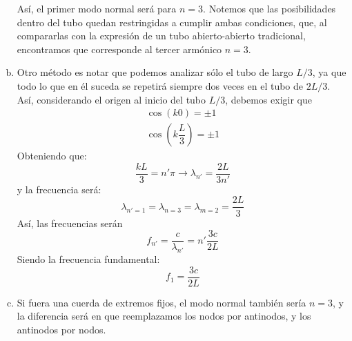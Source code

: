 \begin{enumerate}[a)]
	Así, el primer modo normal será para $n=3$. Notemos que las posibilidades dentro del tubo quedan restringidas a cumplir ambas condiciones, que, al compararlas con la expresión de un tubo abierto-abierto tradicional, encontramos que corresponde al tercer armónico $n=3$.
	
	\item Otro método es notar que podemos analizar sólo el tubo de largo $L/3$, ya que todo lo que en él suceda se repetirá siempre dos veces en el tubo de $2L/3$. Así, considerando el origen al inicio del tubo $L/3$, debemos exigir que
	\begin{align*}
		\cos \left( k 0 \right) = \pm 1 \\
		\cos \left( k \dfrac{L}{3} \right) = \pm 1
	\end{align*}
	Obteniendo que:
	\begin{equation*}
		\dfrac{kL}{3} = n' \pi \rightarrow \lambda_{n'} = \dfrac{2L}{3n'}
	\end{equation*}
	y la frecuencia será:
	\begin{equation*}
		\lambda_{n'=1} = \lambda_{n=3} = \lambda_{m=2} = \dfrac{2L}{3}
	\end{equation*}
	Así, las frecuencias serán
	\begin{equation*}
		f_{n'} = \dfrac{c}{\lambda_{n'}} = n' \dfrac{3c}{2L}
	\end{equation*}
	Siendo la frecuencia fundamental:
	\begin{equation*}
		f_{1} = \dfrac{3c}{2L}
	\end{equation*}

	\item Si fuera una cuerda de extremos fijos, el modo normal también sería $n=3$, y la diferencia será en que reemplazamos los nodos por antinodos, y los antinodos por nodos.
	
\end{enumerate}